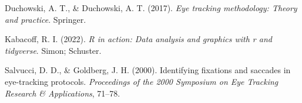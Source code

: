 \documentclass[
  man,
  floatsintext,
  longtable,
  nolmodern,
  notxfonts,
  notimes,
  colorlinks=true,linkcolor=blue,citecolor=blue,urlcolor=blue]{apa7}
\newlength{\cslhangindent}
\newenvironment{CSLReferences}[2] %
 {\begin{list}{}{%
  \setlength{\itemindent}{0pt}
  \setlength{\leftmargin}{0pt}
  \setlength{\parsep}{0pt}
  \ifodd #1
   \setlength{\leftmargin}{\cslhangindent}
   \setlength{\itemindent}{-1\cslhangindent}
  \fi
  \setlength{\itemsep}{#2\baselineskip}}}
 {\end{list}}
\begin{document}
\label{refs}
\begin{CSLReferences}{1}{0}
Duchowski, A. T., \& Duchowski, A. T. (2017). \emph{Eye tracking
methodology: Theory and practice}. Springer.

Kabacoff, R. I. (2022). \emph{R in action: Data analysis and graphics
with r and tidyverse}. Simon; Schuster.

Salvucci, D. D., \& Goldberg, J. H. (2000). Identifying fixations and
saccades in eye-tracking protocols. \emph{Proceedings of the 2000
Symposium on Eye Tracking Research \& Applications}, 71--78.

\end{CSLReferences}
\end{document}
